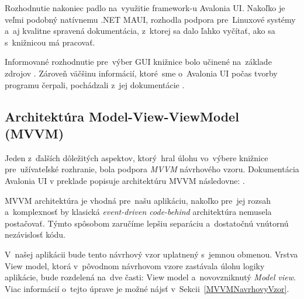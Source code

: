 Rozhodnutie nakoniec padlo na~využitie framework-u Avalonia UI. Nakoľko je veľmi podobný natívnemu .NET MAUI, rozhodla podpora pre~Linuxové systémy a~aj kvalitne spravená dokumentácia, z~ktorej sa dalo ľahko  vyčítať, ako sa s~knižnicou má pracovať. 

Informované rozhodnutie pre~výber GUI knižnice bolo učinené na~základe zdrojov \cite{WpfGuide,WhatIsMAUI,AvaloniaMauiComparison}. Zároveň väčšinu informácií, ktoré~sme o~Avalonia UI počas tvorby programu čerpali, pochádzali z~jej dokumentácie \cite{AvaloniaDokumentacia}.

\subsection{Architektúra Model-View-ViewModel (MVVM)}\label{ArchitekturaMVVM}

Jeden z~ďalších dôležitých aspektov, ktorý~hral úlohu vo~výbere knižnice pre~užívateľské rozhranie, bola podpora \textit{MVVM} návrhového vzoru. Dokumentácia Avalonia UI v preklade popisuje architektúru MVVM následovne: \cite{MVVMDefByAvalonia}.


MVVM architektúra je vhodná pre~našu aplikáciu, nakoľko pre~jej rozsah a~komplexnosť by klasická \textit{event-driven code-behind} architektúra nemusela postačovať. Týmto spôsobom zaručíme lepšiu separáciu a~dostatočnú vnútornú nezávislosť kódu.    

V~našej aplikácii bude tento návrhový vzor uplatnený s~jemnou obmenou. Vrstva View model, ktorá v~pôvodnom návrhovom vzore zastávala úlohu logiky aplikácie, bude rozdelená na~dve časti: View model a~novovzniknutý \textit{Model view}. Viac informácií o~tejto úprave je možné nájsť v~Sekcii~\ref{MVVMNavrhovyVzor}. 

